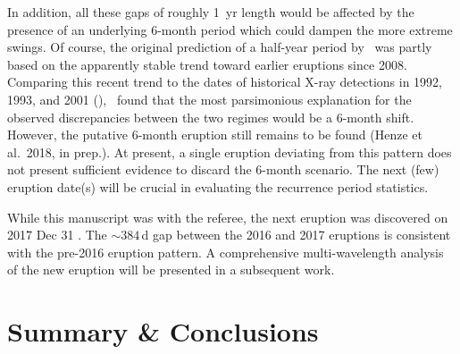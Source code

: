 \documentclass[twocolumn,tighten]{aastex6}
\newcommand{\xonek}{\citetalias{2014A&A...563L...8H}}
\newcommand{\halfk}{\citetalias{2015A&A...582L...8H}}
\begin{document}
In addition, all these gaps of roughly 1~yr length would be affected by the presence of an underlying 6-month period which could dampen the more extreme swings. Of course, the original prediction of a half-year period by \halfk\ was partly based on the apparently stable trend toward earlier eruptions since 2008. Comparing this recent trend to the dates of historical X-ray detections in 1992, 1993, and 2001 (\xonek), \halfk\ found that the most parsimonious explanation for the observed discrepancies between the two regimes would be a 6-month shift. However, the putative 6-month eruption still remains to be found (Henze et al.\ 2018, in prep.). At present, a single eruption deviating from this pattern does not present sufficient evidence to discard the 6-month scenario. The next (few) eruption date(s) will be crucial in evaluating the recurrence period statistics.

While this manuscript was with the referee, the next eruption was discovered on 2017 Dec 31 \citep{2017ATel11116....1B}. The $\sim384$\,d gap between the 2016 and 2017 eruptions is consistent with the pre-2016 eruption pattern. A comprehensive multi-wavelength analysis of the new eruption will be presented in a subsequent work.


\section{Summary \& Conclusions}\label{sec:conclusions}
\end{document}
